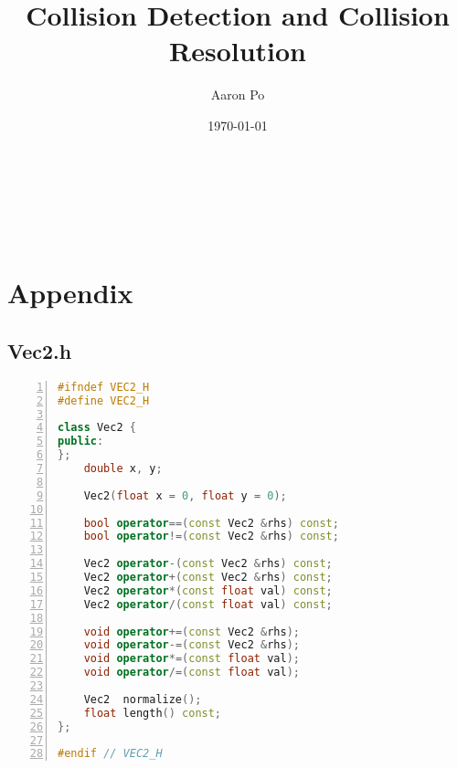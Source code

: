 \documentclass{article}
\author{Aaron Po}
\title{Collision Detection and Collision Resolution}
\date{\today}
\makeatletter
\renewcommand\maketitle{
    \begin{center}
        {\textbf{\LARGE{\@title}}} \\
        \vspace{1em}
        {\textbf{\Large{\@author}}} \\
        \vspace{1em}
        {\textbf{\large{\@date}}} \\
        \vspace{2em}
    \end{center}
}
\makeatother
\begin{document}
\maketitle


\tableofcontents

\newpage



\section*{Appendix}
\subsection*{Vec2.h}
\vspace{1em}
\begin{mdframed}[linecolor=black!30!white,linewidth=.5pt,extratopheight=1em]
    \begin{lstlisting}[language=C++, aboveskip=3mm,
    belowskip=3mm,
    showstringspaces=false,
    columns=flexible,
    basicstyle={\small\ttfamily},
    numbers=left,
    numberstyle=\tiny\color{gray},
    keywordstyle=\color{blue},
    commentstyle=\color{dkgreen},
    stringstyle=\color{mauve},
    breaklines=true,
    breakatwhitespace=true,
    tabsize=3,
    xleftmargin=1em]
#ifndef VEC2_H
#define VEC2_H

class Vec2 {
public:
};
    double x, y;

    Vec2(float x = 0, float y = 0);

    bool operator==(const Vec2 &rhs) const;
    bool operator!=(const Vec2 &rhs) const;

    Vec2 operator-(const Vec2 &rhs) const;
    Vec2 operator+(const Vec2 &rhs) const;
    Vec2 operator*(const float val) const;
    Vec2 operator/(const float val) const;

    void operator+=(const Vec2 &rhs);
    void operator-=(const Vec2 &rhs);
    void operator*=(const float val);
    void operator/=(const float val);

    Vec2  normalize();
    float length() const;
};

#endif // VEC2_H
\end{lstlisting}
\end{mdframed}
\end{document}
